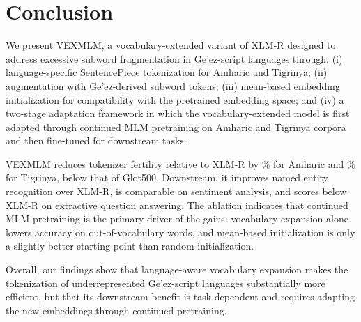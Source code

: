 \section{Conclusion}
We present VEXMLM, a vocabulary-extended variant of XLM-R designed to address excessive subword fragmentation in Ge'ez-script languages through: (i) language-specific SentencePiece tokenization for Amharic and Tigrinya; (ii) augmentation with \vocabAdded{} Ge'ez-derived subword tokens; (iii) mean-based embedding initialization for compatibility with the pretrained embedding space; and (iv) a two-stage adaptation framework in which the vocabulary-extended model is first adapted through continued MLM pretraining on Amharic and Tigrinya corpora and then fine-tuned for downstream tasks.

VEXMLM reduces tokenizer fertility relative to XLM-R by \tokFertRedAmh\% for Amharic and \tokFertRedTir\% for Tigrinya, below that of Glot500. Downstream, it improves named entity recognition over XLM-R, is comparable on sentiment analysis, and scores below XLM-R on extractive question answering. The ablation indicates that continued MLM pretraining is the primary driver of the gains: vocabulary expansion alone lowers accuracy on out-of-vocabulary words, and mean-based initialization is only a slightly better starting point than random initialization.

Overall, our findings show that language-aware vocabulary expansion makes the tokenization of underrepresented Ge'ez-script languages substantially more efficient, but that its downstream benefit is task-dependent and requires adapting the new embeddings through continued pretraining.
